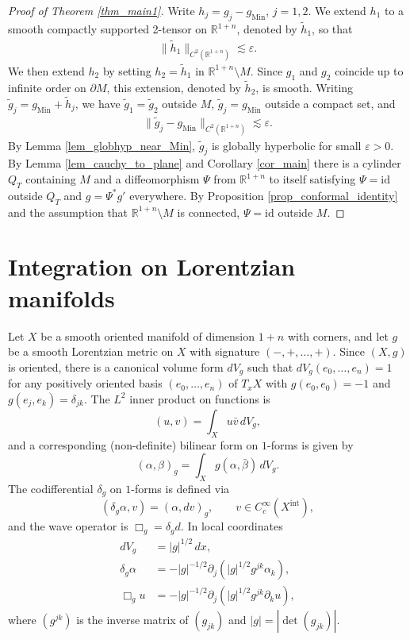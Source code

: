 \documentclass[11pt,letterpaper]{amsart}
\theoremstyle{definition}
\numberwithin{equation}{section}
\newcommand{\mR}{\mathbb{R}}                    %
\newcommand{\norm}[1]{\lVert #1 \rVert}         %
\newcommand{\id}{\mathrm{id}}
\newcommand{\eps}{\varepsilon}
\newcommand{\p}{\partial}
\newcommand{\gm}{g_{\mathrm{Min}}}
\def\p{\partial}
\def\R{\mathbb R}
\begin{document}
\begin{proof}[Proof of Theorem \ref{thm_main1}]
Write $h_j = g_j - \gm$, $j=1,2$. We extend $h_1$ to a smooth compactly supported 2-tensor on $\R^{1+n}$, denoted by $\tilde h_1$, so that 
    \begin{align*}
\norm{\tilde h_1}_{C^2(\R^{1+n})} \lesssim \eps.
    \end{align*}
We then extend $h_2$ by setting $h_2 = \tilde h_1$ in $\R^{1+n} \setminus M$. Since $g_1$ and $g_2$ coincide up to infinite order on $\p M$, this extension, denoted by $\tilde h_2$, is smooth. Writing $\tilde g_j = \gm + \tilde h_j$, we have $\tilde g_1 = \tilde g_2$ outside $M$, $\tilde g_j = \gm$ outside a compact set, and 
    \begin{align*}
\norm{\tilde g_j - \gm}_{C^2(\R^{1+n})} \lesssim \eps.
    \end{align*}
By Lemma \ref{lem_globhyp_near_Min}, $\tilde g_j$ is globally hyperbolic for small $\eps > 0$. By Lemma \ref{lem_cauchy_to_plane} and Corollary \ref{cor_main} there is a cylinder $Q_T$ containing $M$ and a diffeomorphism $\Psi$ from $\mR^{1+n}$ to itself satisfying $\Psi = \id$ outside $Q_T$ and $g = \Psi^* g'$ everywhere. By Proposition \ref{prop_conformal_identity} and the assumption that $\mR^{1+n} \setminus M$ is connected, $\Psi = \id$ outside $M$.
\end{proof}









\appendix

\section{Integration on Lorentzian manifolds} \label{lorentzian_integration}

Let $X$ be a smooth oriented manifold of dimension $1+n$ with corners, and let $g$ be a smooth Lorentzian metric on $X$ with signature $(-,+,\ldots,+)$. Since $(X, g)$ is oriented, there is a canonical volume form $dV_g$ such that $dV_g(e_0, \ldots, e_n) = 1$ for any positively oriented basis $(e_0, \ldots, e_n)$ of $T_x X$ with $g(e_0, e_0) = -1$ and $g(e_j, e_k) = \delta_{jk}$. The $L^2$ inner product on functions is  
\[
(u, v) = \int_X u \bar{v} \,dV_g,
\]
and a corresponding (non-definite) bilinear form on $1$-forms is given by 
\[
(\alpha, \beta)_g = \int_X g(\alpha, \bar{\beta}) \,dV_g.
\]
The codifferential $\delta_g$ on $1$-forms is defined via 
\[
(\delta_g \alpha, v) = (\alpha, dv)_g, \qquad v \in C^{\infty}_c(X^{\mathrm{int}}),
\]
and the wave operator is $\Box_g = \delta_g d$. In local coordinates 
\begin{align*}
dV_g &= |g|^{1/2} \,dx, \\
\delta_g \alpha &= - |g|^{-1/2} \p_j( |g|^{1/2} g^{jk} \alpha_k), \\
\Box_g u &= -|g|^{-1/2} \p_j( |g|^{1/2} g^{jk} \p_k u),
\end{align*}
where $(g^{jk})$ is the inverse matrix of $(g_{jk})$ and $|g| = |\det(g_{jk})|$.
\end{document}

